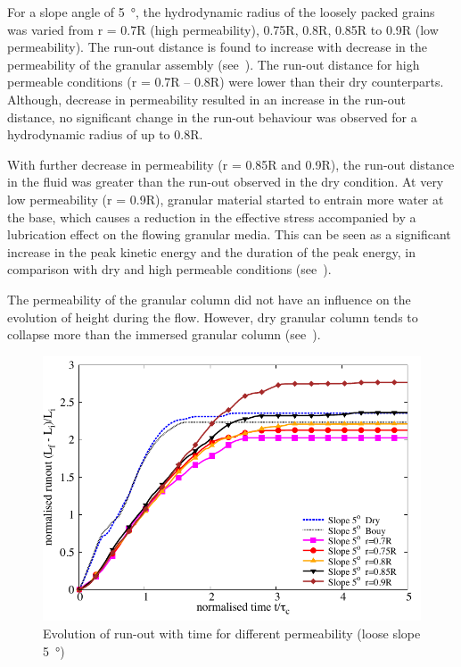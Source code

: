 \documentclass[12pt,a4paper,twocolumn,fleqn]{NARMS}
\begin{document}
For a slope angle of \SI{5}{\degree}, the hydrodynamic radius of the loosely packed grains was varied from r = 0.7R (high permeability), 0.75R, 0.8R, 0.85R to 0.9R (low permeability). The run-out distance is found to increase with decrease in the permeability of the granular assembly (see~). The run-out distance for high permeable conditions (r = 0.7R -- 0.8R) were lower than their dry counterparts. Although, decrease in permeability resulted in an increase in the run-out distance, no significant change in the run-out behaviour was observed for a hydrodynamic radius of up to 0.8R.

With further decrease in permeability (r = 0.85R and 0.9R), the run-out distance in the fluid was greater than the run-out observed in the dry condition. At very low permeability (r = 0.9R), granular material started to entrain more water at the base, which causes a reduction in the effective stress accompanied by a lubrication effect on the flowing granular media. This can be seen as a significant increase in the peak kinetic energy and the duration of the peak energy, in comparison with dry and high permeable conditions (see~).

The permeability of the granular column did not have an influence on the evolution of height during the flow. However, dry granular column tends to collapse more than the immersed granular column (see~).

\begin{figure}
\centering
\includegraphics[width=0.97\columnwidth]{figs/Runout_loose_5.pdf}
\caption{Evolution of run-out with time for different permeability (loose slope \SI{5}{\degree})}
\label{fig:run5}
\end{figure}
\end{document}
